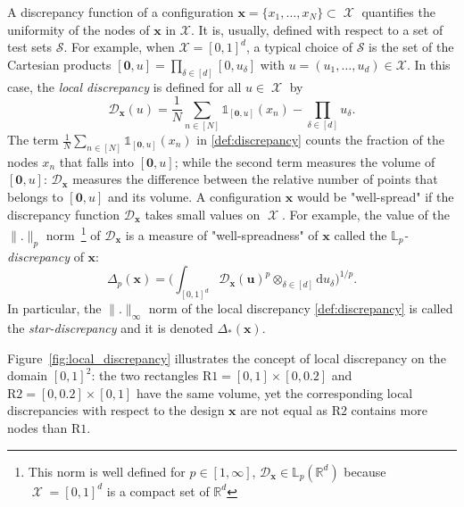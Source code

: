 \documentclass[twoside,11pt]{book}
\numberwithin{theorem}{chapter}
\numberwithin{definition}{chapter}
\numberwithin{proposition}{chapter}
\numberwithin{corollary}{chapter}
\numberwithin{example}{chapter}
\numberwithin{lemma}{chapter}
\DeclareMathOperator{\X}{\mathcal{X}}
\begin{document}
 A discrepancy function of a configuration $\bm{x} = \{x_{1}, \dots, x_{N} \} \subset \X$ quantifies the uniformity of the nodes of $\bm{x}$ in $\mathcal{X}$. It is, usually, defined with respect to a set of test sets $\mathcal{S}$. For example, when $\mathcal{X} = [0,1]^{d}$, a typical choice of $\mathcal{S}$ is the set of the Cartesian products $[\bm{0},u] = \prod_{\delta \in [d]}[0,u_{\delta}]$ with $u = (u_{1}, \dots, u_{d}) \in \mathcal{X}$. In this case, the \emph{local discrepancy} is defined for all $u \in \X$ by 
\begin{equation}\label{def:discrepancy}
\mathcal{D}_{\bm{x}}(u) = \frac{1}{N}\sum\limits_{n \in [N]} \mathbb{1}_{[\bm{0},u]}(x_{n}) - \prod\limits_{\delta \in [d]}u_{\delta}.
\end{equation}  
The term $\frac{1}{N}\sum_{n \in [N]} \mathbb{1}_{[\bm{0},u]}(x_{n})$ in \eqref{def:discrepancy} counts the fraction of the nodes $x_{n}$ that falls into $[\bm{0},u]$; while the second term measures the volume of $[\bm{0},u]$: $\mathcal{D}_{\bm{x}}$ measures the difference between the relative number of points that belongs to $[\bm{0},u]$ and its volume. A configuration $\bm{x}$ would be "well-spread" if the discrepancy function $\mathcal{D}_{\bm{x}}$ takes small values on $\X$. For example, the value of the $\|.\|_{p}$ norm~\footnote{This norm is well defined for $p \in [1,\infty]$, $\mathcal{D}_{\bm{x}} \in \mathbb{L}_{p}(\mathbb{R}^{d})$ because $\X = [0,1]^{d}$ is a compact set of $\mathbb{R}^{d}$} of $\mathcal{D}_{\bm{x}}$ is a measure of "well-spreadness" of $\bm{x}$ called the \emph{$\mathbb{L}_{p}$-discrepancy} of $\bm{x}$:
\begin{equation}
\Delta_{p}(\bm{x}) = \bigg(\int_{[0,1]^{d}}\mathcal{D}_{\bm{x}}(\bm{u})^{p} \otimes_{\delta \in [d]} \mathrm{d}u_{\delta}\bigg)^{1/p}.
\end{equation}
In particular, the $\|.\|_{\infty}$ norm of the local discrepancy \eqref{def:discrepancy} is called the \emph{star-discrepancy} and it is denoted $\Delta_{*}(\bm{x})$.

Figure~\ref{fig:local_discrepancy} illustrates the concept of local discrepancy on the domain $[0,1]^{2}$: the two rectangles $\mathrm{R1} = [0,1] \times [0,0.2]$ and $\mathrm{R2} = [0,0.2] \times [0,1]$ have the same volume, yet the corresponding local discrepancies with respect to the design $\bm{x}$ are not equal as $\mathrm{R2}$ contains more nodes than $\mathrm{R1}$.
\end{document}
